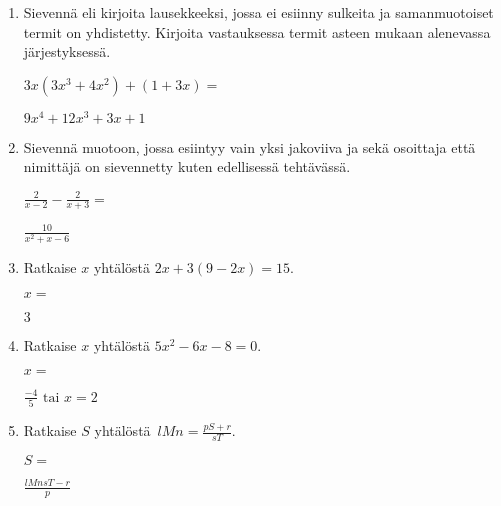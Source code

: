 \documentclass[finnish, a4paper, 12pt]{article}
\begin{document}
\begin{enumerate}[leftmargin=*]
		\vspace{8pt}
		
		\item %
		Sievennä eli kirjoita lausekkeeksi, jossa ei esiinny sulkeita ja 
		samanmuotoiset termit on yhdistetty. 
		Kirjoita vastauksessa termit asteen mukaan alenevassa järjestyksessä. 
		
		\(
		\displaystyle
		3x(3x^3 + 4x^2) + (1 + 3x) = 
		\) %
		\begin{version:withAnswers}
		\( 9x^4 +12x^3 +3x +1 \)
		\end{version:withAnswers}
		
		\vspace{8pt}
		
		\item %
		Sievennä %
		muotoon, jossa esiintyy vain yksi jakoviiva ja sekä osoittaja
		että nimittäjä on sievennetty kuten edellisessä tehtävässä.
		
		\(
		\displaystyle
		\frac{2}{x-2}- \frac{2}{x + 3} =
		\) %
		\begin{version:withAnswers}
		\( \frac{10}{x^2+x-6} \)
		\end{version:withAnswers}
		
		\vspace{8pt}
		
		\item %
		Ratkaise \(x\) yhtälöstä \(2x + 3(9 - 2x) = 15\).
		
		\(
		x = 
		\)	%
		\begin{version:withAnswers}
		 \( 3 \)
		\end{version:withAnswers}
		\vspace{8pt}
		
		\item %
		Ratkaise \(x\) yhtälöstä \(5x^2-6x-8= 0\).
		
		\(
		x = 		
		\)	%
		
		\begin{version:withAnswers}
		\(\frac{-4}{5} \text{  tai } x = 2\)
		\end{version:withAnswers}
		\vspace{8pt}
		
		\item %
		Ratkaise \(S\) yhtälöstä 
		\(
		\displaystyle \,
		lMn = \frac{pS+r}{sT} .
		\)	
		
		\(
		S = 
		\) %
		\begin{version:withAnswers}
		\( \frac{lMnsT -r}{p}\)
		\end{version:withAnswers}
		
	\end{enumerate}
	
	
\end{document}
